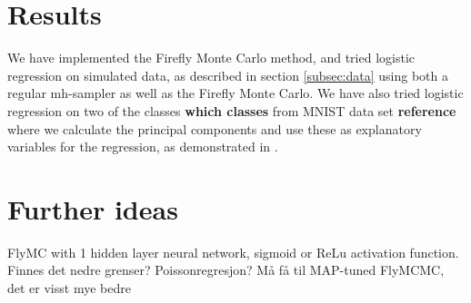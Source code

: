 \documentclass{article}
\theoremstyle{definition}
\begin{document}
\section*{Results}
We have implemented the Firefly Monte Carlo method, and tried logistic regression on simulated data, as described in section \ref{subsec:data} using both a regular \gls{mh}-sampler as well as the Firefly Monte Carlo. 
We have also tried logistic regression on two of the classes \textbf{which classes} from MNIST data set \textbf{reference} where we calculate the principal components and use these as explanatory variables for the regression, as demonstrated in \cite{Maclaurin:1}. 
\section*{Further ideas}
FlyMC with 1 hidden layer neural network, sigmoid or ReLu activation function. Finnes det nedre grenser? 
Poissonregresjon?
Må få til MAP-tuned FlyMCMC, det er visst mye bedre
\printbibliography
\end{document}
